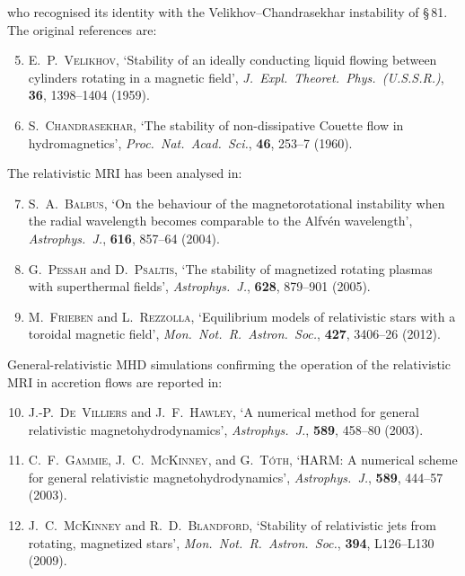 \noindent who recognised its identity with the Velikhov--Chandrasekhar
instability of \S\,81.  The original references are:

\begin{enumerate}
\setcounter{enumi}{4}
\item E.~P.~\textsc{Velikhov},
  `Stability of an ideally conducting liquid flowing between
  cylinders rotating in a magnetic field',
  \textit{J.\ Expl.\ Theoret.\ Phys.\ (U.S.S.R.)}, \textbf{36},
  1398--1404 (1959).

\item S.~\textsc{Chandrasekhar},
  `The stability of non-dissipative Couette flow in hydromagnetics',
  \textit{Proc.\ Nat.\ Acad.\ Sci.}, \textbf{46}, 253--7 (1960).
\end{enumerate}

\noindent The relativistic MRI has been analysed in:

\begin{enumerate}
\setcounter{enumi}{6}
\item S.~A.~\textsc{Balbus},
  `On the behaviour of the magnetorotational instability when the
  radial wavelength becomes comparable to the Alfv\'en wavelength',
  \textit{Astrophys.\ J.}, \textbf{616}, 857--64 (2004).

\item G.~\textsc{Pessah} and D.~\textsc{Psaltis},
  `The stability of magnetized rotating plasmas with superthermal
  fields',
  \textit{Astrophys.\ J.}, \textbf{628}, 879--901 (2005).

\item M.~\textsc{Frieben} and L.~\textsc{Rezzolla},
  `Equilibrium models of relativistic stars with a toroidal magnetic
  field',
  \textit{Mon.\ Not.\ R.\ Astron.\ Soc.}, \textbf{427}, 3406--26
  (2012).
\end{enumerate}

\noindent General-relativistic MHD simulations confirming the operation
of the relativistic MRI in accretion flows are reported in:

\begin{enumerate}
\setcounter{enumi}{9}
\item J.-P.~\textsc{De~Villiers} and J.~F.~\textsc{Hawley},
  `A numerical method for general relativistic magnetohydrodynamics',
  \textit{Astrophys.\ J.}, \textbf{589}, 458--80 (2003).

\item C.~F.~\textsc{Gammie}, J.~C.~\textsc{McKinney},
  and G.~\textsc{T\'oth},
  `HARM: A numerical scheme for general relativistic
  magnetohydrodynamics',
  \textit{Astrophys.\ J.}, \textbf{589}, 444--57 (2003).

\item J.~C.~\textsc{McKinney} and R.~D.~\textsc{Blandford},
  `Stability of relativistic jets from rotating, magnetized stars',
  \textit{Mon.\ Not.\ R.\ Astron.\ Soc.}, \textbf{394},
  L126--L130 (2009).
\end{enumerate}

